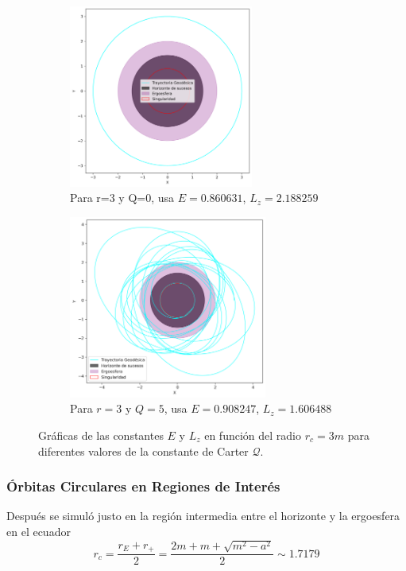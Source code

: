 \begin{figure}[H]

    \begin{subfigure}{0.5\textwidth}
        \includegraphics[width=0.9\linewidth, height=6cm]{AgujerosNegros/kerr/geodesics_plots/geodesica_circular_r3_Q0_planoxy.png}
        \caption{Para r=3 y Q=0, usa $E=0.860631$, $L_z=2.188259$}
    \end{subfigure}
    \begin{subfigure}{0.5\textwidth}
        \includegraphics[width=0.9\linewidth, height=6cm]{AgujerosNegros/kerr/geodesics_plots/geodesica_circular_r3_Q5_planoxy.png}
        \caption{Para $r=3$ y $Q=5$, usa $E=0.908247$, $L_z=1.606488$}

    \end{subfigure}

    \caption{Gráficas de las constantes $E$ y $L_z$ en función del radio $r_c = 3m$ para diferentes valores de la constante de Carter $\mathcal{Q}$.}
\end{figure}

\subsubsection{Órbitas Circulares en Regiones de Interés}
Después se simuló justo en la región intermedia entre el horizonte y la ergoesfera en el ecuador
\begin{equation}
    r_c =\frac{r_E + r_+}{2}=\frac{2m + m +\sqrt{m^2-a^2}}{2}\sim 1.7179
\end{equation}

